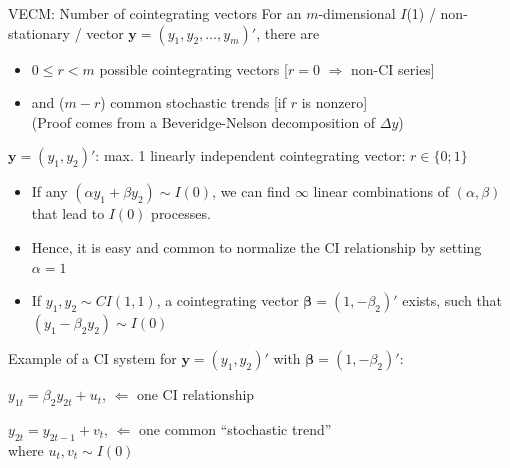 \documentclass[usenames,dvipsnames]{beamer}
\begin{document}
\begin{frame}{VECM: Number of cointegrating vectors}
\footnotesize
For an $m$-dimensional $I$(1) / non-stationary / vector $\bm{y}=(y_1, y_2, \dots, y_m)'$, there are
\begin{itemize}
\item $0 \leq r < m$ possible cointegrating vectors [$r=0$ $\Rightarrow$ non-CI series]
\item and ($m-r$) common stochastic trends [if $r$ is nonzero]\\
(Proof comes from a Beveridge-Nelson decomposition of $\Delta y$)
\end{itemize}  \medskip
$\bm{y} = (y_1, y_2)'$: max. 1 linearly independent cointegrating vector: $r \in \{0;1\}$
\begin{itemize}
\item If any $(\alpha y_1 + \beta y_2) \sim I(0)$, we can find $\infty$ linear combinations of $(\alpha, \beta)$ that lead to $I(0)$ processes.
\item Hence, it is easy and common to normalize the CI relationship by setting $\alpha=1$
\item If $y_1, y_2 \sim CI(1,1)$, a cointegrating vector $\bm{\beta} = (1, -\beta_2)'$ exists, such that $(y_1 - \beta_2 y_2) \sim I(0)$
\end{itemize} \medskip
Example of a CI system for $\bm{y} = (y_1, y_2)'$ with $\bm{\beta} = (1, -\beta_2)'$:
\begin{enumerate}[ {[}1{]} ]
\item $y_{1t} = \beta_2 y_{2t} + u_t$, \qquad $\Leftarrow$ one CI relationship
\item $y_{2t} = y_{2t-1} + v_t$, \qquad $\Leftarrow$ one common ``stochastic trend''\\
where $u_t, v_t \sim I(0)$
\end{enumerate}
\end{frame}
\end{document}
